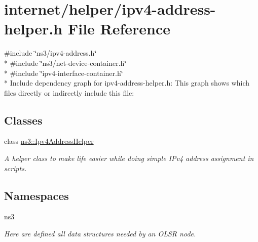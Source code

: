 \hypertarget{ipv4-address-helper_8h}{}\section{internet/helper/ipv4-\/address-\/helper.h File Reference}
\label{ipv4-address-helper_8h}
{\ttfamily \#include \char`\"{}ns3/ipv4-\/address.\+h\char`\"{}}\\*
{\ttfamily \#include \char`\"{}ns3/net-\/device-\/container.\+h\char`\"{}}\\*
{\ttfamily \#include \char`\"{}ipv4-\/interface-\/container.\+h\char`\"{}}\\*
Include dependency graph for ipv4-\/address-\/helper.h\+:
This graph shows which files directly or indirectly include this file\+:
\subsection*{Classes}
\begin{DoxyCompactItemize}
\item 
class \hyperlink{classns3_1_1Ipv4AddressHelper}{ns3\+::\+Ipv4\+Address\+Helper}
\begin{DoxyCompactList}\small\item\em A helper class to make life easier while doing simple I\+Pv4 address assignment in scripts. \end{DoxyCompactList}\end{DoxyCompactItemize}
\subsection*{Namespaces}
\begin{DoxyCompactItemize}
\item 
 \hyperlink{namespacens3}{ns3}
\begin{DoxyCompactList}\small\item\em Here are defined all data structures needed by an O\+L\+SR node. \end{DoxyCompactList}\end{DoxyCompactItemize}
